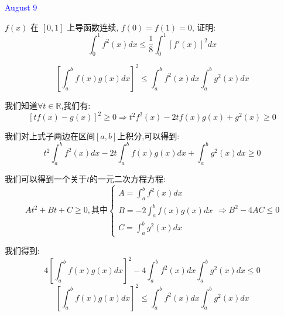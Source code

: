 \textcolor{blue}{August 9}

\begin{example}[][Exam: 34.2.3]
	$f(x)$ 在 $[0,1]$ 上导函数连续, $f(0)=f(1)=0$, 证明:
	$$\int_{0}^{1}f^{2}(x)dx\leq \dfrac{1}{8}\int_{0}^{1}[f'(x)]^2dx$$
\end{example}

\begin{theorem}[积分形式柯西不等式]
	$$\left[ \int_{a}^{b}f(x)g(x)dx\right] ^2\leq \int_{a}^{b}f^2(x)dx\int_{a}^{b}g^{2}(x)dx$$
	
	我们知道$\forall t\in\mathbb{R}$,我们有:  
	$$\left[ tf(x)-g(x)\right]^2\geq 0\Rightarrow t^2f^{2}(x)-2tf(x)g(x)+g^{2}(x)\geq 0$$
	
	我们对上式子两边在区间$[a,b]$上积分,可以得到:  
	$$t^2\int_{a}^{b}f^{2}(x)dx-2t\int_{a}^{b}f(x)g(x)dx+\int_{a}^{b}g^{2}(x)dx\geq 0$$
	
	我们可以得到一个关于$t$的一元二次方程方程:  
	$$At^2+Bt+C\geq 0,\text{其中}\left\lbrace
	\begin{array}{l}
		A=\int_{a}^{b}f^{2}(x)dx\\
		B=-2\int_{a}^{b}f(x)g(x)dx\\
		C=\int_{a}^{b}g^{2}(x)dx
	\end{array}
	\right. \Rightarrow B^2-4AC\leq 0$$
	
	我们得到:  $$4\left[ \int_{a}^{b}f(x)g(x)dx\right]^2-4\int_{a}^{b}f^{2}(x)dx\int_{a}^{b}g^{2}(x)dx\leq 0 
	$$
	$$\left[ \int_{a}^{b}f(x)g(x)dx\right] ^2\leq \int_{a}^{b}f^2(x)dx\int_{a}^{b}g^{2}(x)dx$$
\end{theorem}
